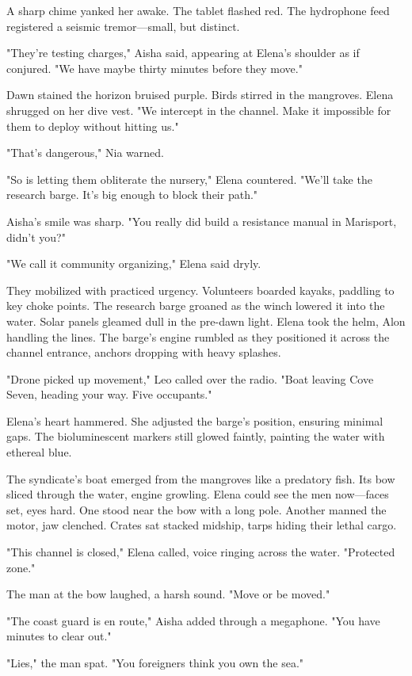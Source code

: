 A sharp chime yanked her awake. The tablet flashed red. The hydrophone feed registered a seismic tremor—small, but distinct.

"They're testing charges," Aisha said, appearing at Elena's shoulder as if conjured. "We have maybe thirty minutes before they move."

Dawn stained the horizon bruised purple. Birds stirred in the mangroves. Elena shrugged on her dive vest. "We intercept in the channel. Make it impossible for them to deploy without hitting us."

"That's dangerous," Nia warned.

"So is letting them obliterate the nursery," Elena countered. "We'll take the research barge. It's big enough to block their path."

Aisha's smile was sharp. "You really did build a resistance manual in Marisport, didn't you?"

"We call it community organizing," Elena said dryly.

They mobilized with practiced urgency. Volunteers boarded kayaks, paddling to key choke points. The research barge groaned as the winch lowered it into the water. Solar panels gleamed dull in the pre-dawn light. Elena took the helm, Alon handling the lines. The barge's engine rumbled as they positioned it across the channel entrance, anchors dropping with heavy splashes.

"Drone picked up movement," Leo called over the radio. "Boat leaving Cove Seven, heading your way. Five occupants."

Elena's heart hammered. She adjusted the barge's position, ensuring minimal gaps. The bioluminescent markers still glowed faintly, painting the water with ethereal blue.

The syndicate's boat emerged from the mangroves like a predatory fish. Its bow sliced through the water, engine growling. Elena could see the men now—faces set, eyes hard. One stood near the bow with a long pole. Another manned the motor, jaw clenched. Crates sat stacked midship, tarps hiding their lethal cargo.

"This channel is closed," Elena called, voice ringing across the water. "Protected zone."

The man at the bow laughed, a harsh sound. "Move or be moved."

"The coast guard is en route," Aisha added through a megaphone. "You have minutes to clear out."

"Lies," the man spat. "You foreigners think you own the sea."

